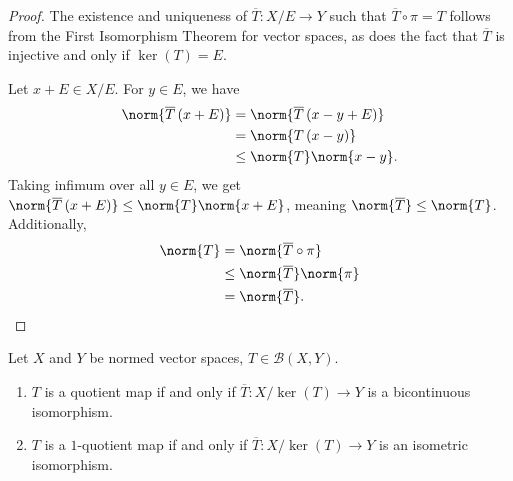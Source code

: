 \documentclass[10pt]{mypackage}
\begin{document}
\begin{proof}
  The existence and uniqueness of $\overline{T}: X/E\rightarrow Y$ such that $\overline{T}\circ \pi = T$ follows from the First Isomorphism Theorem for vector spaces, as does the fact that $\overline{T}$ is injective and only if $\ker(T) = E$.\newline

  Let $x+E\in X/E$. For $y\in E$, we have
  \begin{align*}
    \norm{\overline{T}\left(x+E\right)} &= \norm{\overline{T}\left(x-y+E\right)}\\
                                        &= \norm{T\left(x-y\right)}\\
                                        &\leq \norm{T}\norm{x-y}.
  \end{align*}
  Taking infimum over all $y\in E$, we get $\norm{\overline{T}\left(x+E\right)} \leq \norm{T}\norm{x+E}$, meaning $\norm{\overline{T}}\leq \norm{T}$. Additionally,
  \begin{align*}
    \norm{T} &= \norm{\overline{T}\circ \pi}\\
             &\leq \norm{\overline{T}}\norm{\pi}\\
             &= \norm{\overline{T}}.
  \end{align*}
\end{proof}
\begin{theorem}
  Let $X$ and $Y$ be normed vector spaces, $T\in \mathcal{B}\left(X,Y\right)$.
  \begin{enumerate}[(1)]
    \item $T$ is a quotient map if and only if $\overline{T}: X/\ker(T) \rightarrow Y$ is a bicontinuous isomorphism.
    \item $T$ is a $1$-quotient map if and only if $\overline{T}: X/\ker(T) \rightarrow Y$ is an isometric isomorphism.
  \end{enumerate}
\end{theorem}
\end{document}
